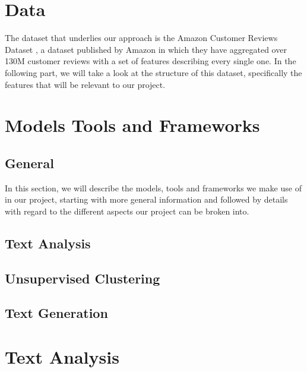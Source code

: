 \documentclass[]{report}
\begin{document}
\chapter{Data}
The dataset that underlies our approach is the Amazon Customer Reviews Dataset \cite{amazondataset}, a dataset published by Amazon in which they have aggregated over 130M customer reviews with a set of features describing every single one. In the following part, we will take a look at the structure of this dataset, specifically the features that will be relevant to our project.

\chapter{Models Tools and Frameworks}
\section{General}
In this section, we will describe the models, tools and frameworks we make use of in our project, starting with more general information and followed by details with regard to the different aspects our project can be broken into.

\section{Text Analysis}

\section{Unsupervised Clustering}

\section{Text Generation}


\chapter{Text Analysis}



\printbibliography[title={References}]
\end{document}
